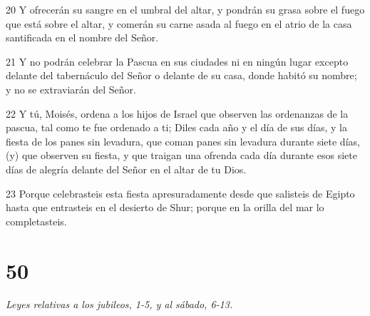 \par 20 Y ofrecerán su sangre en el umbral del altar, y pondrán su grasa sobre el fuego que está sobre el altar, y comerán su carne asada al fuego en el atrio de la casa santificada en el nombre del Señor.
\par 21 Y no podrán celebrar la Pascua en sus ciudades ni en ningún lugar excepto delante del tabernáculo del Señor o delante de su casa, donde habitó su nombre; y no se extraviarán del Señor.
\par 22 Y tú, Moisés, ordena a los hijos de Israel que observen las ordenanzas de la pascua, tal como te fue ordenado a ti; Diles cada año y el día de sus días, y la fiesta de los panes sin levadura, que coman panes sin levadura durante siete días, (y) que observen su fiesta, y que traigan una ofrenda cada día durante esos siete días de alegría delante del Señor en el altar de tu Dios.
\par 23 Porque celebrasteis esta fiesta apresuradamente desde que salisteis de Egipto hasta que entrasteis en el desierto de Shur; porque en la orilla del mar lo completasteis.

\chapter{50}

\par \textit{Leyes relativas a los jubileos, 1-5, y al sábado, 6-13.}

